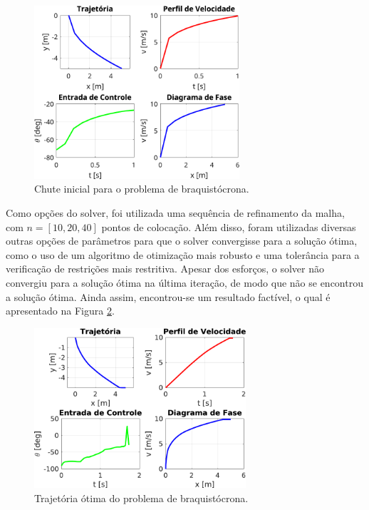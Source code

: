 \begin{figure}[H]
    \centering
    \includegraphics[width=0.68\textwidth]{Cap4/figuras/braquistocrona-chute.pdf}
    \caption{Chute inicial para o problema de braquistócrona.}
    \label{fig:resultados-braquistocrona-chute}
\end{figure}

Como opções do solver, foi utilizada uma sequência de refinamento da malha, com $n=[10, 20, 40]$ pontos de colocação. Além disso, foram utilizadas diversas outras opções de parâmetros para que o solver convergisse para a solução ótima, como o uso de um algoritmo de otimização mais robusto e uma tolerância para a verificação de restrições mais restritiva. Apesar dos esforços, o solver não convergiu para a solução ótima na última iteração, de modo que não se encontrou a solução ótima. Ainda assim, encontrou-se um resultado factível, o qual é apresentado na Figura \ref{fig:resultados-braquistocrona}.

\begin{figure}[H]
    \centering
    \includegraphics[width=0.7\textwidth]{Cap4/figuras/braquistocrona.pdf}
    \caption{Trajetória ótima do problema de braquistócrona.}
    \label{fig:resultados-braquistocrona}
\end{figure}

